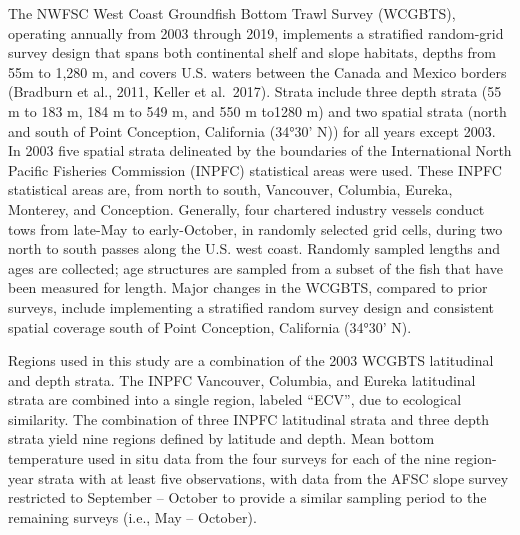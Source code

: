 \documentclass[]{article}
\begin{document}
The NWFSC West Coast Groundfish Bottom Trawl Survey (WCGBTS), operating
annually from 2003 through 2019, implements a stratified random-grid
survey design that spans both continental shelf and slope habitats,
depths from 55m to 1,280 m, and covers U.S. waters between the Canada
and Mexico borders (Bradburn et al., 2011, Keller et al.~2017). Strata
include three depth strata (55 m to 183 m, 184 m to 549 m, and 550 m
to1280 m) and two spatial strata (north and south of Point Conception,
California (34°30' N)) for all years except 2003. In 2003 five spatial
strata delineated by the boundaries of the International North Pacific
Fisheries Commission (INPFC) statistical areas were used. These INPFC
statistical areas are, from north to south, Vancouver, Columbia, Eureka,
Monterey, and Conception. Generally, four chartered industry vessels
conduct tows from late-May to early-October, in randomly selected grid
cells, during two north to south passes along the U.S. west coast.
Randomly sampled lengths and ages are collected; age structures are
sampled from a subset of the fish that have been measured for length.
Major changes in the WCGBTS, compared to prior surveys, include
implementing a stratified random survey design and consistent spatial
coverage south of Point Conception, California (34°30' N).

Regions used in this study are a combination of the 2003 WCGBTS
latitudinal and depth strata. The INPFC Vancouver, Columbia, and Eureka
latitudinal strata are combined into a single region, labeled ``ECV'',
due to ecological similarity. The combination of three INPFC latitudinal
strata and three depth strata yield nine regions defined by latitude and
depth. Mean bottom temperature used in situ data from the four surveys
for each of the nine region-year strata with at least five observations,
with data from the AFSC slope survey restricted to September -- October
to provide a similar sampling period to the remaining surveys (i.e., May
-- October).
\end{document}
